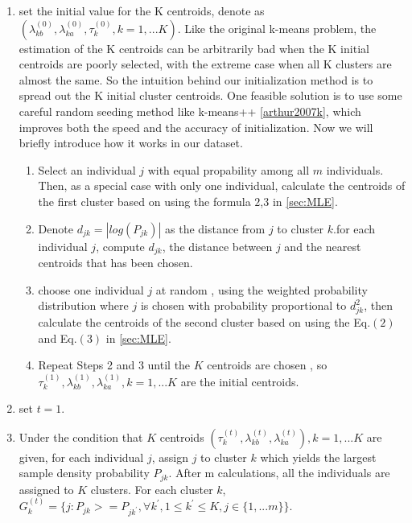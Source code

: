 \documentclass[12pt]{article}
\begin{document}
\begin{enumerate}[Step 1:]


\item set the initial value for the K centroids, denote as $(\lambda_{kb}^{(0)},\lambda_{ka}^{(0)},\tau_k^{(0)},k=1,...K)$. Like the original k-means problem, the estimation of the K centroids can be arbitrarily bad when the K initial centroids are poorly selected, with the extreme case when all K clusters are almost the same. So the intuition behind our initialization method is to spread out the K initial cluster centroids. One feasible solution is to use some careful random seeding method like k-means++ \ref{arthur2007k}, which improves both the speed and the accuracy of initialization. Now we will briefly introduce how it works in our dataset. 


\begin{enumerate}[(1):]
\item Select an individual $j$ with equal propability among all $m$ individuals. Then, as a special case with only one individual, calculate the centroids of the first cluster based on using the formula $2$,$3$ in \ref{sec:MLE}.
\item Denote $d_{jk}=|log(P_{jk})|$ as the distance from $j$ to cluster $k$.for each individual $j$, compute $d_{jk}$, the distance between $j$ and the nearest centroids that has been chosen.

\item choose one individual $j$ at random , using the weighted probability distribution where $j$ is chosen with probability proportional to $d_{jk}^2$, then calculate the centroids of the second cluster based on using the Eq.$(2)$ and Eq.$(3)$ in \ref{sec:MLE}.

\item Repeat Steps 2 and 3 until the $K$ centroids are chosen , so $\tau_{k}^{(1)},\lambda_{kb}^{(1)},\lambda_{ka}^{(1)},k=1,...K$ are the initial centroids.
\end{enumerate}



\item set $t=1$.
\item Under the condition that $K$ centroids $(\tau_{k}^{(t)},\lambda_{kb}^{(t)},\lambda_{ka}^{(t)}),k=1,...K$ are given, for each individual $j$,  assign $j$ to cluster $k$ which yields the largest sample density probability $P_{jk}$. After m calculations, all the individuals are assigned to $K$ clusters. For each cluster $k$, $G_k^{(t)}=\{j:P_{jk}>=P_{jk^{'}},\forall k^{'},1 \leq k^{'}\leq K,j\in\{1,...m\}\}$.


\end{enumerate}
\end{document}
